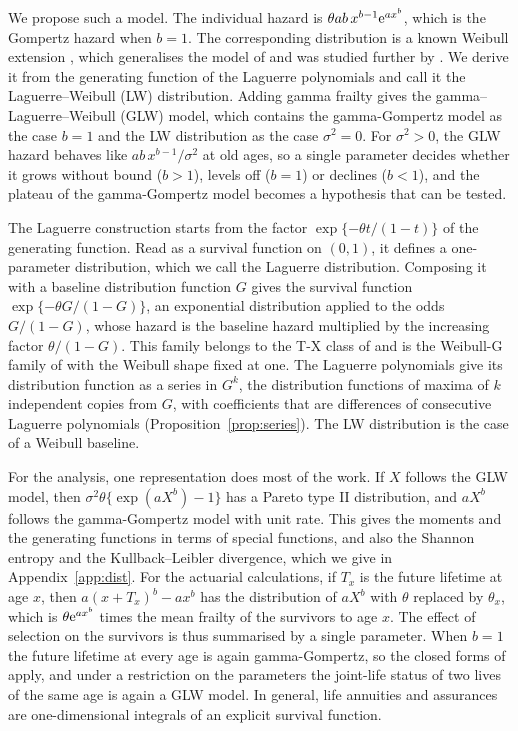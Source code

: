 \documentclass[12pt]{article}
\newcommand{\e}{{\rm e}}         %
\begin{document}
We propose such a model. The individual hazard is $\theta ab\,x^{b-1}\e^{ax^b}$, which is the Gompertz hazard when $b=1$. The corresponding distribution is a known Weibull extension \citep{xie2002modified}, which generalises the model of \citet{chen2000new} and was studied further by \citet{tang2003statistical}. We derive it from the generating function of the Laguerre polynomials and call it the Laguerre--Weibull (LW) distribution. Adding gamma frailty gives the gamma--Laguerre--Weibull (GLW) model, which contains the gamma-Gompertz model as the case $b=1$ and the LW distribution as the case $\sigma^2=0$. For $\sigma^2>0$, the GLW hazard behaves like $ab\,x^{b-1}/\sigma^2$ at old ages, so a single parameter decides whether it grows without bound ($b>1$), levels off ($b=1$) or declines ($b<1$), and the plateau of the gamma-Gompertz model becomes a hypothesis that can be tested.

The Laguerre construction starts from the factor $\exp\{-\theta t/(1-t)\}$ of the generating function. Read as a survival function on $(0,1)$, it defines a one-parameter distribution, which we call the Laguerre distribution. Composing it with a baseline distribution function $G$ gives the survival function $\exp\{-\theta G/(1-G)\}$, an exponential distribution applied to the odds $G/(1-G)$, whose hazard is the baseline hazard multiplied by the increasing factor $\theta/(1-G)$. This family belongs to the T-X class of \citet{alzaatreh2013new} and is the Weibull-G family of \citet{bourguignon2014weibull} with the Weibull shape fixed at one. The Laguerre polynomials give its distribution function as a series in $G^k$, the distribution functions of maxima of $k$ independent copies from $G$, with coefficients that are differences of consecutive Laguerre polynomials (Proposition~\ref{prop:series}). The LW distribution is the case of a Weibull baseline.

For the analysis, one representation does most of the work. If $X$ follows the GLW model, then $\sigma^2\theta\{\exp(aX^b)-1\}$ has a Pareto type II distribution, and $aX^b$ follows the gamma-Gompertz model with unit rate. This gives the moments and the generating functions in terms of special functions, and also the Shannon entropy and the Kullback--Leibler divergence, which we give in Appendix~\ref{app:dist}. For the actuarial calculations, if $T_x$ is the future lifetime at age $x$, then $a(x+T_x)^b-ax^b$ has the distribution of $aX^b$ with $\theta$ replaced by $\theta_x$, which is $\theta\e^{ax^b}$ times the mean frailty of the survivors to age $x$. The effect of selection on the survivors is thus summarised by a single parameter. When $b=1$ the future lifetime at every age is again gamma-Gompertz, so the closed forms of \citet{castellares2024gamma} apply, and under a restriction on the parameters the joint-life status of two lives of the same age is again a GLW model. In general, life annuities and assurances are one-dimensional integrals of an explicit survival function.
\end{document}
